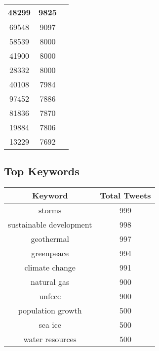 \documentclass{article}\usepackage[T1]{fontenc}
\begin{document}
\begin{tabular}{|c|c|c|}
 \hline
48299 & 9825\\ 
 \hline
69548 & 9097\\ 
 \hline
58539 & 8000\\ 
 \hline
41900 & 8000\\ 
 \hline
28332 & 8000\\ 
 \hline
40108 & 7984\\ 
 \hline
97452 & 7886\\ 
 \hline
81836 & 7870\\ 
 \hline
19884 & 7806\\ 
 \hline
13229 & 7692\\ 
 \hline
\end{tabular}\subsection*{Top Keywords}\begin{tabular}{|c|c|}         \hline         Keyword & Total Tweets \\ 
 \hline
storms & 999\\ 
 \hline
sustainable development & 998\\ 
 \hline
geothermal & 997\\ 
 \hline
greenpeace & 994\\ 
 \hline
climate change & 991\\ 
 \hline
natural gas & 900\\ 
 \hline
unfccc & 900\\ 
 \hline
population growth & 500\\ 
 \hline
sea ice & 500\\ 
 \hline
water resources & 500\\ 
 \hline
\end{tabular}
\end{document}
